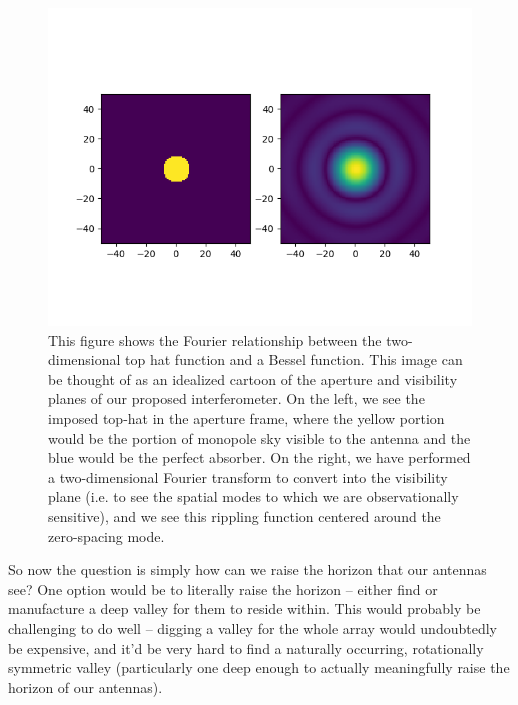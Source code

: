\begin{figure}
    \begin{center}
    \includegraphics[width=\linewidth]{top-hat-bessel.png}
    \end{center}
    \caption{
        This figure shows the Fourier relationship between the two-dimensional 
        top hat function and a Bessel function. This image can be thought of as 
        an idealized cartoon of the aperture and visibility planes of our 
        proposed interferometer. On the left, we see the imposed top-hat in the 
        aperture frame, where the yellow portion would be the portion of 
        monopole sky visible to the antenna and the blue would be the perfect 
        absorber.  On the right, we have performed a two-dimensional Fourier 
        transform to convert into the visibility plane (i.e. to see the spatial 
        modes to which we are observationally sensitive), and we see this 
        rippling function centered around the zero-spacing mode.
    }
    \label{fig:sinc}
\end{figure}

So now the question is simply how can we raise the horizon that our antennas 
see? One option would be to literally raise the horizon -- either find or 
manufacture a deep valley for them to reside within. This would probably be 
challenging to do well -- digging a valley for the whole array would 
undoubtedly be expensive, and it'd be very hard to find a naturally occurring, 
rotationally symmetric valley (particularly one deep enough to actually 
meaningfully raise the horizon of our antennas).

